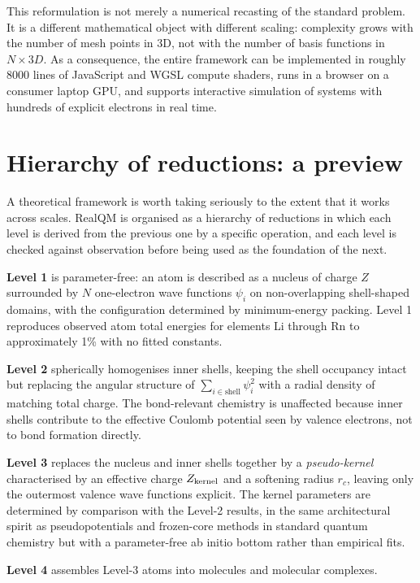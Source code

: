 This reformulation is not merely a numerical recasting of the standard problem. It is a different mathematical object with different scaling: complexity grows with the number of mesh points in 3D, not with the number of basis functions in $N \times 3D$. As a consequence, the entire framework can be implemented in roughly 8000 lines of JavaScript and WGSL compute shaders, runs in a browser on a consumer laptop GPU, and supports interactive simulation of systems with hundreds of explicit electrons in real time.

\section{Hierarchy of reductions: a preview}

A theoretical framework is worth taking seriously to the extent that it works across scales. RealQM is organised as a hierarchy of reductions in which each level is derived from the previous one by a specific operation, and each level is checked against observation before being used as the foundation of the next.

\textbf{Level 1} is parameter-free: an atom is described as a nucleus of charge $Z$ surrounded by $N$ one-electron wave functions $\psi_i$ on non-overlapping shell-shaped domains, with the configuration determined by minimum-energy packing. Level 1 reproduces observed atom total energies for elements Li through Rn to approximately 1\% with no fitted constants.

\textbf{Level 2} spherically homogenises inner shells, keeping the shell occupancy intact but replacing the angular structure of $\sum_{i \in \text{shell}} \psi_i^2$ with a radial density of matching total charge. The bond-relevant chemistry is unaffected because inner shells contribute to the effective Coulomb potential seen by valence electrons, not to bond formation directly.

\textbf{Level 3} replaces the nucleus and inner shells together by a \emph{pseudo-kernel} characterised by an effective charge $Z_{\rm kernel}$ and a softening radius $r_c$, leaving only the outermost valence wave functions explicit. The kernel parameters are determined by comparison with the Level-2 results, in the same architectural spirit as pseudopotentials and frozen-core methods in standard quantum chemistry but with a parameter-free ab initio bottom rather than empirical fits.

\textbf{Level 4} assembles Level-3 atoms into molecules and molecular complexes.

